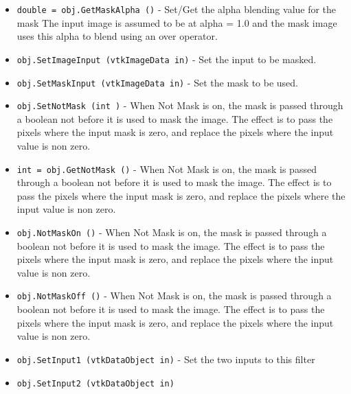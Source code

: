 \begin{itemize}
\item  \verb|double = obj.GetMaskAlpha ()| -  Set/Get the alpha blending value for the mask
 The input image is assumed to be at alpha = 1.0
 and the mask image uses this alpha to blend using
 an over operator.

\item  \verb|obj.SetImageInput (vtkImageData in)| -  Set the input to be masked.

\item  \verb|obj.SetMaskInput (vtkImageData in)| -  Set the mask to be used.

\item  \verb|obj.SetNotMask (int )| -  When Not Mask is on, the mask is passed through a boolean not
 before it is used to mask the image.  The effect is to pass the
 pixels where the input mask is zero, and replace the pixels
 where the input value is non zero.

\item  \verb|int = obj.GetNotMask ()| -  When Not Mask is on, the mask is passed through a boolean not
 before it is used to mask the image.  The effect is to pass the
 pixels where the input mask is zero, and replace the pixels
 where the input value is non zero.

\item  \verb|obj.NotMaskOn ()| -  When Not Mask is on, the mask is passed through a boolean not
 before it is used to mask the image.  The effect is to pass the
 pixels where the input mask is zero, and replace the pixels
 where the input value is non zero.

\item  \verb|obj.NotMaskOff ()| -  When Not Mask is on, the mask is passed through a boolean not
 before it is used to mask the image.  The effect is to pass the
 pixels where the input mask is zero, and replace the pixels
 where the input value is non zero.

\item  \verb|obj.SetInput1 (vtkDataObject in)| -  Set the two inputs to this filter

\item  \verb|obj.SetInput2 (vtkDataObject in)|

\end{itemize}

